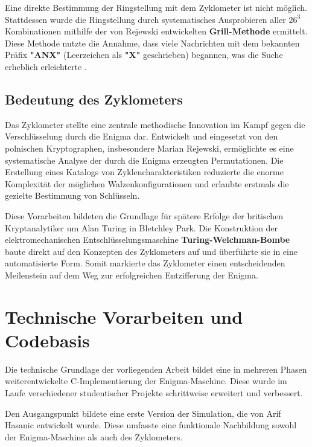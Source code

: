 \documentclass[12pt, ngerman, a4paper, numbers=noenddot]{article}
\begin{document}
Eine direkte Bestimmung der Ringstellung mit dem Zyklometer ist nicht möglich. Stattdessen wurde die Ringstellung durch systematisches Ausprobieren aller $26^3$ Kombinationen mithilfe der von Rejewski entwickelten \textbf{Grill-Methode} ermittelt. Diese Methode nutzte die Annahme, dass viele Nachrichten mit dem bekannten Präfix \textbf{"ANX"} (Leerzeichen als  \textbf{"X"} geschrieben) begannen, was die Suche erheblich erleichterte \autocite{rejewski1981enigma}.



\subsection{Bedeutung des Zyklometers}

Das Zyklometer stellte eine zentrale methodische Innovation im Kampf gegen die Verschlüsselung durch die Enigma dar. Entwickelt und eingesetzt von den polnischen Kryptographen, insbesondere Marian Rejewski, ermöglichte es eine systematische Analyse der durch die Enigma erzeugten Permutationen. Die Erstellung eines Katalogs von Zyklencharakteristiken reduzierte die enorme Komplexität der möglichen Walzenkonfigurationen und erlaubte erstmals die gezielte Bestimmung von Schlüsseln.

Diese Vorarbeiten bildeten die Grundlage für spätere Erfolge der britischen Kryptanalytiker um Alan Turing in Bletchley Park. Die Konstruktion der elektromechanischen Entschlüsselungsmaschine \textbf{Turing-Welchman-Bombe} baute direkt auf den Konzepten des Zyklometers auf und überführte sie in eine automatisierte Form. Somit markierte das Zyklometer einen entscheidenden Meilenstein auf dem Weg zur erfolgreichen Entzifferung der Enigma.





\section{Technische Vorarbeiten und Codebasis}
\label{sec:analyse_c_implementation}

Die technische Grundlage der vorliegenden Arbeit bildet eine in mehreren Phasen weiterentwickelte C-Implementierung der Enigma-Maschine. Diese wurde im Laufe verschiedener studentischer Projekte schrittweise erweitert und verbessert.

Den Ausgangspunkt bildete eine erste Version der Simulation, die von Arif Hasanic entwickelt wurde. Diese umfasste eine funktionale Nachbildung sowohl der Enigma-Maschine als auch des Zyklometers\autocite{hasanic2024enigma}.
\end{document}
